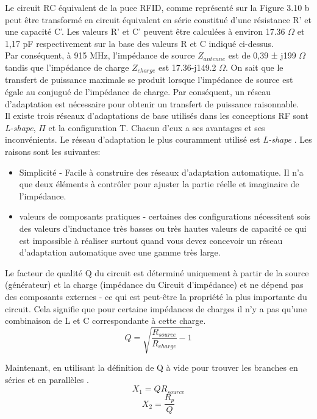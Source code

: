 \documentclass[11pt, a4paper, twoside]{book}
\begin{document}
Le circuit RC équivalent de la puce RFID, comme représenté sur la Figure 3.10 b peut être transformé en circuit équivalent en série constitué d'une résistance  R' et une capacité C'. Les valeurs R' et C'  peuvent être calculées à environ 17.36 \(\Omega\) et 1,17 pF respectivement sur la base des valeurs R et C indiqué ci-dessus.\\


Par conséquent, à 915 MHz, l'impédance de source \(Z_{antenne} \) est de 0,39 ± j199 \(\Omega\) tandis que l'impédance de charge \(Z_{charge} \) est 17.36-j149.2 \(\Omega\). On sait que le transfert de puissance maximale se produit lorsque l'impédance de source est égale au conjugué de l'impédance de charge. Par conséquent, un réseau d'adaptation est nécessaire pour obtenir un transfert de puissance raisonnable.\\

Il existe trois réseaux d'adaptations de base utilisés dans les conceptions RF sont \emph{L-shape}, \(\Pi\) et la configuration T. Chacun d'eux a ses avantages et ses inconvénients. Le réseau d'adaptation le plus couramment utilisé est \emph{L-shape} . Les raisons sont les suivantes:
\begin{itemize}
\item Simplicité - Facile à construire des réseaux d'adaptation automatique. Il n'a que deux éléments à contrôler pour ajuster la partie réelle et imaginaire de l'impédance.
\item valeurs de composants pratiques - certaines des configurations nécessitent sois des valeurs d'inductance très basses ou très hautes valeurs de capacité ce qui est impossible à réaliser surtout quand vous devez concevoir un réseau d'adaptation automatique avec une gamme très large.\\
\end{itemize}

Le facteur de qualité Q du circuit est déterminé uniquement à partir de la source (générateur) et la charge (impédance du Circuit d'impédance) et ne dépend pas des composants externes - ce qui est peut-être la propriété la plus importante du circuit. Cela signifie que pour certaine impédances de charges il n'y a pas qu'une combinaison de L et C correspondante à cette charge.
\begin{equation}
Q = \sqrt{\dfrac{R_{source}}{R_{charge}}-1}
\end{equation}

Maintenant, en utilisant la définition de Q à vide pour trouver les branches en séries et en parallèles .
\begin{equation}
X_{1}=QR_{source}
\end{equation}
\begin{equation}
X_{2}=\dfrac{R_{p}}{Q}
\end{equation}
\end{document}
